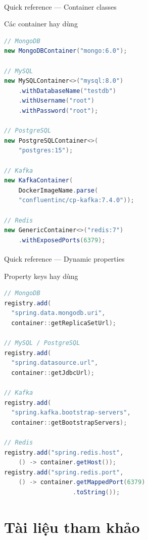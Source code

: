 \documentclass[aspectratio=169,10pt]{beamer}
\newcommand{\sref}[1]{\textsuperscript{\scriptsize\cite{#1}}}
\begin{document}
\begin{frame}[fragile]{Quick reference --- Container classes\sref{testcontainers}}
    \begin{block}{Các container hay dùng}
\begin{lstlisting}[language=Java,style=small]
// MongoDB
new MongoDBContainer("mongo:6.0");

// MySQL
new MySQLContainer<>("mysql:8.0")
    .withDatabaseName("testdb")
    .withUsername("root")
    .withPassword("root");

// PostgreSQL
new PostgreSQLContainer<>(
    "postgres:15");

// Kafka
new KafkaContainer(
    DockerImageName.parse(
    "confluentinc/cp-kafka:7.4.0"));

// Redis
new GenericContainer<>("redis:7")
    .withExposedPorts(6379);
\end{lstlisting}
    \end{block}
\end{frame}

\begin{frame}[fragile]{Quick reference --- Dynamic properties\sref{testcontainers}}
    \begin{block}{Property keys hay dùng}
\begin{lstlisting}[language=Java,style=small]
// MongoDB
registry.add(
  "spring.data.mongodb.uri",
  container::getReplicaSetUrl);

// MySQL / PostgreSQL
registry.add(
  "spring.datasource.url",
  container::getJdbcUrl);

// Kafka
registry.add(
  "spring.kafka.bootstrap-servers",
  container::getBootstrapServers);

// Redis
registry.add("spring.redis.host",
    () -> container.getHost());
registry.add("spring.redis.port",
    () -> container.getMappedPort(6379)
                   .toString());
\end{lstlisting}
    \end{block}
\end{frame}


\section{Tài liệu tham khảo}
\end{document}
